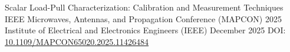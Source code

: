 

\begin{cventries}

	\cventry
	{Scalar Load-Pull Characterization: Calibration and Measurement Techniques} %
	{IEEE Microwaves, Antennas, and Propagation Conference (MAPCON) 2025} %
	{Institute of Electrical and Electronics Engineers (IEEE)} %
	{December 2025} %
	{DOI: {\href{https://doi.org/10.1109/MAPCON65020.2025.11426484}{10.1109/MAPCON65020.2025.11426484}}}
	
	
	

\end{cventries}
